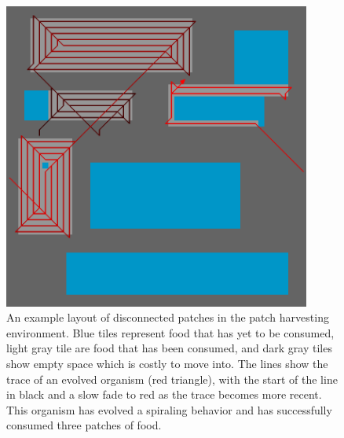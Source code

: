 \begin{figure}
    \centering
    \includegraphics[width=0.9\textwidth]{06_memory_in_patch_harvesting/media/patch_harvest_example.png}
    \caption{
    An example layout of disconnected patches in the patch harvesting environment.
    Blue tiles represent food that has yet to be consumed, light gray tile are food that has been consumed, and dark gray tiles show empty space which is costly to move into. 
    The lines show the trace of an evolved organism (red triangle), with the start of the line in black and a slow fade to red as the trace becomes more recent. 
    This organism has evolved a spiraling behavior and has successfully consumed three patches of food. 
    }
    \label{fig:patch_harvest:example}
\end{figure}


